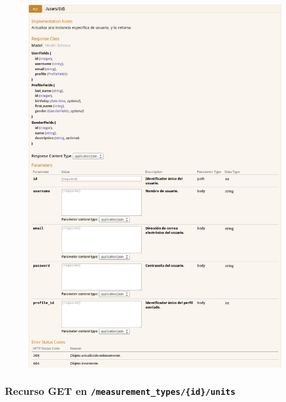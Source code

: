 \begin{figure}[h]
  \centering
  \includegraphics[width=\textwidth,height=.75\textheight,keepaspectratio]{img/especificacion_api/userView_put}
  \label{userView_put}
\end{figure}

\newpage


\subsubsection{Recurso GET en \texttt{/measurement\_types/\{id\}/units}}

